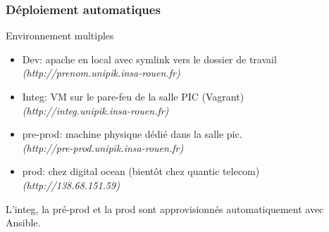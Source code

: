 \begin{frame}
\frametitle{Déploiement automatiques}
\begin{block}{Environnement multiples}
	\begin{itemize}
		\item Dev: apache en local avec symlink vers le dossier de travail \\
		\emph{\tiny(http://prenom.unipik.insa-rouen.fr)}
		\item Integ: VM sur le pare-feu de la salle PIC (Vagrant) \\
		\emph{\tiny(http://integ.unipik.insa-rouen.fr)}
		\item pre-prod: machine physique dédié dans la salle pic. \\
		\emph{\tiny(http://pre-prod.unipik.insa-rouen.fr)}
		\item prod: chez digital ocean (bientôt chez quantic telecom) \\
		\emph{\tiny(http://138.68.151.59)}
	\end{itemize}
\end{block}

L'integ, la pré-prod et la prod sont approvisionnés automatiquement avec Ansible.

\end{frame}
